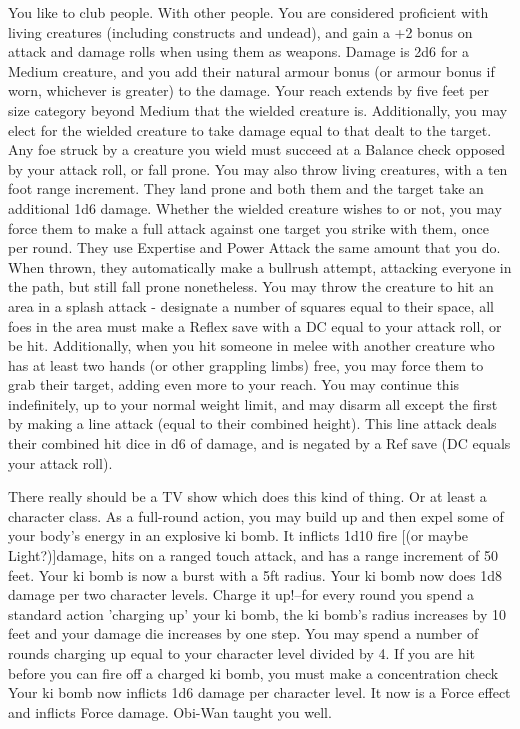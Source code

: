 \begin{multicols}{2}
\label{comm:feat:foewielder}{}
{You like to club people. With other people.
}{You are considered proficient with living creatures (including constructs and undead), and gain a +2 bonus on attack and damage rolls when using them as weapons. Damage is 2d6 for a Medium creature, and you add their natural armour bonus (or armour bonus if worn, whichever is greater) to the damage.
}{Your reach extends by five feet per size category beyond Medium that the wielded creature is. Additionally, you may elect for the wielded creature to take damage equal to that dealt to the target.
}{Any foe struck by a creature you wield must succeed at a Balance check opposed by your attack roll, or fall prone. You may also throw living creatures, with a ten foot range increment. They land prone and both them and the target take an additional 1d6 damage.
}{Whether the wielded creature wishes to or not, you may force them to make a full attack against one target you strike with them, once per round. They use Expertise and Power Attack the same amount that you do. When thrown, they automatically make a bullrush attempt, attacking everyone in the path, but still fall prone nonetheless.
}{You may throw the creature to hit an area in a splash attack - designate a number of squares equal to their space, all foes in the area must make a Reflex save with a DC equal to your attack roll, or be hit. Additionally, when you hit someone in melee with another creature who has at least two hands (or other grappling limbs) free, you may force them to grab their target, adding even more to your reach. You may continue this indefinitely, up to your normal weight limit, and may disarm all except the first by making a line attack (equal to their combined height). This line attack deals their combined hit dice in d6 of damage, and is negated by a Ref save (DC equals your attack roll).}

\label{comm:feat:kibomb}{}
{There really should be a TV show which does this kind of thing. Or at least a character class.
}{As a full-round action, you may build up and then expel some of your body's energy in an explosive ki bomb. It inflicts 1d10 fire [(or maybe Light?)]damage, hits on a ranged touch attack, and has a range increment of 50 feet.
}{ Your ki bomb is now a burst with a 5ft radius.
}{Your ki bomb now does 1d8 damage per two character levels.
}{Charge it up!--for every round you spend a standard action 'charging up' your ki bomb, the ki bomb's radius increases by 10 feet and your damage die increases by one step. You may spend a number of rounds charging up equal to your character level divided by 4. If you are hit before you can fire off a charged ki bomb, you must make a concentration check
}{Your ki bomb now inflicts 1d6 damage per character level. It now is a Force effect and inflicts Force damage. Obi-Wan taught you well.}


\end{multicols}
